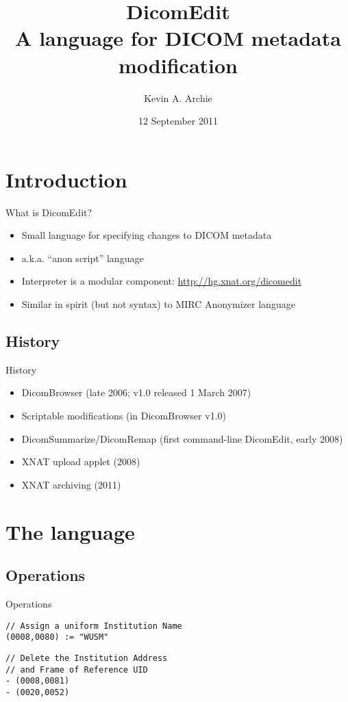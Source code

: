 \documentclass[handout]{beamer}
\title[DicomEdit]{DicomEdit\\A language for DICOM metadata modification}
\author{Kevin A. Archie}
\institute{Washington University Neuroinformatics Research Group}
\date{12 September 2011}
\begin{document}

\begin{frame}
\titlepage
\end{frame}

\section{Introduction}

\begin{frame}{What is DicomEdit?}
\begin{itemize}
\pause \item Small language for specifying changes to DICOM metadata
\pause \item a.k.a. ``anon script'' language
\pause \item Interpreter is a modular component:
\url{http://hg.xnat.org/dicomedit}
\pause \item Similar in spirit (but not syntax) to MIRC Anonymizer language
\end{itemize}
\end{frame}

\subsection{History}
\begin{frame}{History}
\begin{itemize}
\pause \item DicomBrowser (late 2006; v1.0 released 1 March 2007)
\pause \item Scriptable modifications (in DicomBrowser v1.0)
\pause \item DicomSummarize/DicomRemap (first command-line DicomEdit, early 2008)
\pause \item XNAT upload applet (2008)
\pause \item XNAT archiving (2011)
\end{itemize}
\end{frame}

\section{The language}
\subsection{Operations}
\begin{frame}[fragile]{Operations}

\begin{verbatim}
// Assign a uniform Institution Name
(0008,0080) := "WUSM"
\end{verbatim}

\pause
\begin{verbatim}
// Delete the Institution Address
// and Frame of Reference UID
- (0008,0081)
- (0020,0052)
\end{verbatim}

\end{frame}
\end{document}
